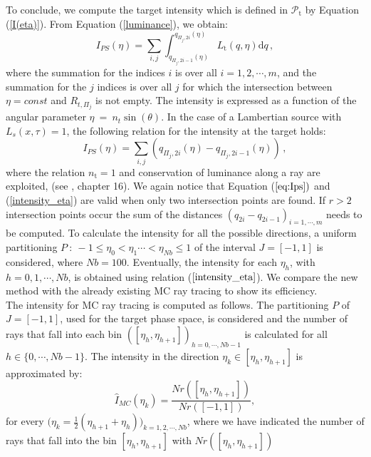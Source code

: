 \indent To conclude, we compute the target intensity which is defined in $\mathcal{P}_{\textrm{t}}$ by Equation (\ref{I(eta)}).
From Equation (\ref{luminance}), we obtain:
\begin{equation}
I_{PS}(\eta) = \sum_{ i, j }\int_{q_{\Pi_j,2i-1}( \eta)}^{q_{\Pi_j, 2i}( \eta)}L_\textrm{t}(q, \eta)\textrm{d}q\,,
\label{eq:Ips}
\end{equation}
where the summation for the indices $i$ is over all $i = 1,2, \cdots, m$, and the summation for the $j$ indices is over all $j$ for which the intersection between $\eta = const$ and $R_{t, \Pi_j}$ is not empty. The intensity is expressed as a function of the angular parameter $\eta~ = ~n_{t}\sin(\theta)$.
In the case of a Lambertian source with $L_{s}(x, \tau) = 1$,
 the following relation for the intensity at the target holds:
\begin{equation}
I_{PS}(\eta) =
\sum_{i,j}(q_{\Pi_j, 2i}(\eta)-q_{\Pi_j,2i-1}(\eta))\,, \label{intensity_eta}
\end{equation}
where the relation  $n_{\textrm{t}}=1$ and conservation of luminance along a ray are exploited, (see \cite{chaves2008introduction}, chapter 16).
We again notice that Equation ($\ref{eq:Ips})$ and (\ref{intensity_eta}) are valid when only two intersection points are found.
If $r>2$ intersection points occur the sum of the distances $(q_{2i}-q_{2i-1})_{i=1, \cdots, m} $ needs to be computed. To calculate the intensity for all the possible directions, a uniform partitioning
$P ~:~ -1\leq \eta_0< \eta_1 \cdots < \eta_{Nb}\leq 1$ of the interval $J = [-1,1]$ is considered, where $Nb= 100$. Eventually, the intensity for each $\eta_h$, with $h = 0,1, \cdots, Nb$, is obtained using relation ($\ref{intensity_eta}$).
  We compare the new method with the already existing MC ray tracing to show its efficiency.\\
 \indent The intensity for MC ray tracing is computed as follows.
 The partitioning $P$ of $J = [-1, 1]$, used for the target phase space, is considered and the number of rays that fall into each bin $([\eta_h, \eta_{h+1}])_{h = 0, \cdots, Nb-1}$ is
 calculated for all $ h \in\{0, \cdots, Nb-1\} $. The intensity in the direction $\eta_k \in [\eta_h, \eta_{h+1}]$ is approximated by:
 \begin{equation}
 \hat{I}_{MC}(\eta_k) = \frac{Nr([\eta_h, \eta_{h+1}])}{Nr([-1, 1])}, \end{equation}
 for every $\Big(\eta_k = \frac{1}{2}(\eta_{h+1}+\eta_h)\Big)_{k = 1,2, \cdots, Nb}$, where we have indicated
 the number of rays that fall into the bin $[\eta_h, \eta_{h+1}]$ with $Nr([\eta_h, \eta_{h+1}])$
